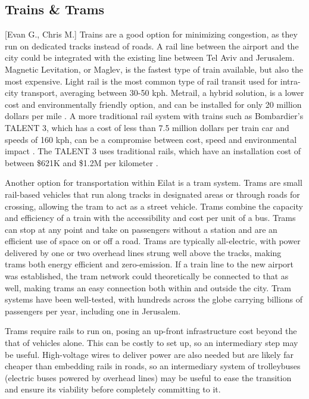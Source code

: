 \documentclass[12pt]{article}                         %
\begin{document}
\subsection{Trains \& Trams}[Evan G., Chris M.]
Trains are a good option for minimizing congestion, as they run on dedicated tracks instead of roads. A rail line between the airport and the city could be integrated with the existing line between Tel Aviv and Jerusalem. Magnetic Levitation, or Maglev, is the fastest type of train available, but also the most expensive. Light rail is the most common type of rail transit used for intra-city transport, averaging between 30-50 kph. Metrail, a hybrid solution, is a lower cost and environmentally friendly option, and can be installed for only 20 million dollars per mile \cite{TheSystem}. A more traditional rail system with trains such as Bombardier's TALENT 3, which has a cost of less than 7.5 million dollars per train car and speeds of 160 kph, can be a compromise between cost, speed and environmental impact \cite{Roy2017Bombardier1.9bn}. The TALENT 3 uses traditional rails, which have an installation cost of between \$621K and \$1.2M per kilometer \cite{CostsSiding}.

Another option for transportation within Eilat is a tram system. Trams are small rail-based vehicles that run along tracks in designated areas or through roads for crossing, allowing the tram to act as a street vehicle. Trams combine the capacity and efficiency of a train with the accessibility and cost per unit of a bus. Trams can stop at any point and take on passengers without a station and are an efficient use of space on or off a road. Trams are typically all-electric, with power delivered by one or two overhead lines strung well above the tracks, making trams both energy efficient and zero-emission. If a train line to the new airport was established, the tram network could theoretically be connected to that as well, making trams an easy connection both within and outside the city. Tram systems have been well-tested, with hundreds across the globe carrying billions of passengers per year, including one in Jerusalem.

Trams require rails to run on, posing an up-front infrastructure cost beyond the that of vehicles alone. This can be costly to set up, so an intermediary step may be useful. High-voltage wires to deliver power are also needed but are likely far cheaper than embedding rails in roads, so an intermediary system of trolleybuses (electric buses powered by overhead lines) may be useful to ease the transition and ensure its viability before completely committing to it. 
\end{document}
